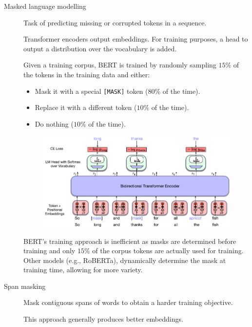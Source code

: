 \begin{description}
    \item[Masked language modelling] 
        Task of predicting missing or corrupted tokens in a sequence.

        \begin{remark}
            Transformer encoders output embeddings. For training purposes, a head to output a distribution over the vocabulary is added.
        \end{remark}

        \begin{example}
            Given a training corpus, BERT is trained by randomly sampling $15\%$ of the tokens in the training data and either:
            \begin{itemize}
                \item Mask it with a special \texttt{[MASK]} token ($80\%$ of the time).
                \item Replace it with a different token ($10\%$ of the time).
                \item Do nothing ($10\%$ of the time).
            \end{itemize}

            \begin{figure}[H]
                \centering
                \includegraphics[width=0.6\linewidth]{./img/_bert_training.pdf}
            \end{figure}

            \indenttbox
            \begin{remark}
                BERT's training approach is inefficient as masks are determined before training and only $15\%$ of the corpus tokens are actually used for training. Other models (e.g., RoBERTa), dynamically determine the mask at training time, allowing for more variety.
            \end{remark}
        \end{example}

    \item[Span masking] 
        Mask contiguous spans of words to obtain a harder training objective.

        \begin{remark}
            This approach generally produces better embeddings.
        \end{remark}
\end{description}


